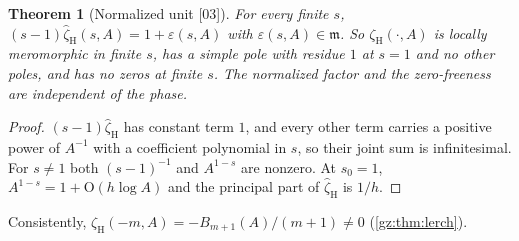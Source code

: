 \documentclass[11pt,a4paper]{article}
\numberwithin{equation}{section}
\newtheorem{theorem}{Theorem}[section]
\theoremstyle{definition}
\theoremstyle{remark}
\newcommand{\mm}{\mathfrak m}
\newcommand{\eps}{\varepsilon}
\newcommand{\zH}{\zeta_{\mathrm H}}
\newcommand{\zHh}{\widehat\zeta_{\mathrm H}}
\newcommand{\src}[1]{\textup{[#1]}}
\newcommand{\bigO}{\mathrm{O}}
\begin{document}
\begin{theorem}[Normalized unit \src{03}]\label{gz:thm:hurwitz-unit}
For every finite $s$, $(s-1)\zHh(s,A)=1+\eps(s,A)$ with $\eps(s,A)\in\mm$. So
$\zH(\cdot,A)$ is locally meromorphic in finite $s$, has a simple pole with
residue $1$ at $s=1$ and no other poles, and has no zeros at finite $s$. The
normalized factor and the zero-freeness are independent of the phase.
\end{theorem}
\begin{proof}
$(s-1)\zHh$ has constant term $1$, and every other term carries a positive
power of $A^{-1}$ with a coefficient polynomial in $s$, so their joint sum
is infinitesimal. For $s\ne1$ both $(s-1)^{-1}$ and $A^{1-s}$ are nonzero.
At $s_0=1$, $A^{1-s}=1+\bigO(h\log A)$ and the principal part of $\zHh$ is
$1/h$.
\end{proof}
Consistently, $\zH(-m,A)=-B_{m+1}(A)/(m+1)\ne0$ (\cref{gz:thm:lerch}).
\end{document}
